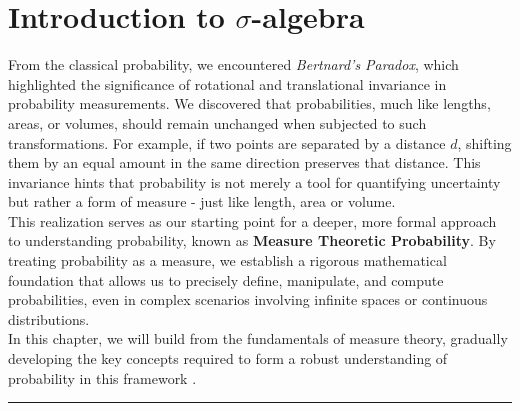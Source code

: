 \chapter{Introduction to $\sigma$-algebra}

From the classical probability, we encountered \textit{Bertnard's Paradox}, which highlighted the significance of rotational and translational invariance in probability measurements. We discovered that probabilities, much like lengths, areas, or volumes, should remain unchanged when subjected to such transformations. For example, if two points are separated by a distance $d$, shifting them by an equal amount in the same direction preserves that distance. This invariance hints that probability is not merely a tool for quantifying uncertainty but rather a form of measure - just like length, area or volume. \\

This realization serves as our starting point for a deeper, more formal approach to understanding probability, known as \textbf{Measure Theoretic Probability}. By treating probability as a measure, we establish a rigorous mathematical foundation that allows us to precisely define, manipulate, and compute probabilities, even in complex scenarios involving infinite spaces or continuous distributions. \\

In this chapter, we will build from the fundamentals of measure theory, gradually developing the key concepts required to form a robust understanding of probability in this framework \cite{probabilityfoundations}.





\vspace{30pt}
\hrule